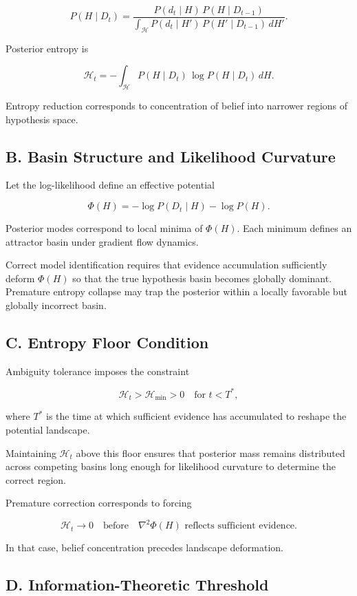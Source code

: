 \documentclass[11pt]{article}
\theoremstyle{remark}
\begin{document}
\[
P(H \mid D_{t})
=
\frac{P(d_t \mid H)\, P(H \mid D_{t-1})}
{\int_{\mathcal{H}} P(d_t \mid H')\, P(H' \mid D_{t-1})\, dH'}.
\]

Posterior entropy is

\[
\mathcal{H}_t
=
- \int_{\mathcal{H}} P(H \mid D_t)\,
\log P(H \mid D_t)\, dH.
\]

Entropy reduction corresponds to concentration of belief into narrower regions of hypothesis space.

\subsection*{B. Basin Structure and Likelihood Curvature}

Let the log-likelihood define an effective potential

\[
\Phi(H)
=
- \log P(D_t \mid H) - \log P(H).
\]

Posterior modes correspond to local minima of $\Phi(H)$. Each minimum defines an attractor basin under gradient flow dynamics.

Correct model identification requires that evidence accumulation sufficiently deform $\Phi(H)$ so that the true hypothesis basin becomes globally dominant. Premature entropy collapse may trap the posterior within a locally favorable but globally incorrect basin.

\subsection*{C. Entropy Floor Condition}

Ambiguity tolerance imposes the constraint

\[
\mathcal{H}_t > \mathcal{H}_{\min} > 0
\quad \text{for } t < T^*,
\]

where $T^*$ is the time at which sufficient evidence has accumulated to reshape the potential landscape.

Maintaining $\mathcal{H}_t$ above this floor ensures that posterior mass remains distributed across competing basins long enough for likelihood curvature to determine the correct region.

Premature correction corresponds to forcing

\[
\mathcal{H}_t \to 0
\quad \text{before} \quad
\nabla^2 \Phi(H) \text{ reflects sufficient evidence}.
\]

In that case, belief concentration precedes landscape deformation.

\subsection*{D. Information-Theoretic Threshold}
\end{document}
